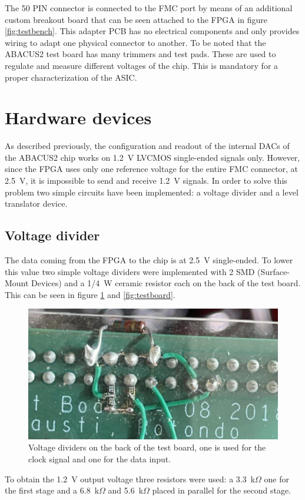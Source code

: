 \noindent The 50 PIN connector is connected to the FMC port by means of an additional custom breakout board that can be seen attached to the FPGA in figure \ref{fig:testbench}. This adapter PCB has no electrical components and only provides wiring to adapt one physical connector to another.
To be noted that the ABACUS2 test board has many trimmers and test pads. These are used to regulate and measure different voltages of the chip. This is mandatory for a proper characterization of the ASIC.
\section{Hardware devices}\label{hardware}
\noindent As described previously, the configuration and readout of the internal DACs of the ABACUS2 chip works on 1.2~V LVCMOS single-ended signals only. However, since the FPGA uses only one reference voltage for the entire FMC connector, at 2.5~V, it is impossible to send and receive 1.2~V signals.
In order to solve this problem two simple circuits have been implemented: a voltage divider and a level translator device.
\subsection{Voltage divider}
The data coming from the FPGA to the chip is at 2.5~V single-ended. To lower this value two simple voltage dividers were implemented with 2 SMD (Surface-Mount Devices) and a 1/4~W ceramic resistor each on the back of the test board. This can be seen in figure \ref{fig:voltagedivider} and \ref{fig:testboard}.
\begin{figure}[H]
	\centering
	\includegraphics[width=0.6\linewidth]{IMG/ch5/VOLTAGEDIVIDER}
	\caption{Voltage dividers on the back of the test board, one is used for the clock signal and one for the data input.}
	\label{fig:voltagedivider}
\end{figure}
\noindent To obtain the 1.2~V output voltage three resistors were used: a 3.3~k$\Omega$ one for the first stage and a 6.8~k$\Omega$ and 5.6~k$\Omega$ placed in parallel for the second stage.
